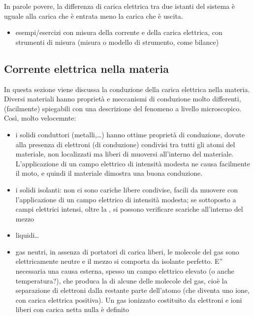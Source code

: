 \documentclass[letterpaper,10pt,italian]{jupyterBook}
\begin{document}
\sphinxAtStartPar
In parole povere, la differenza di carica elettrica tra due istanti del sistema è uguale alla carica che è entrata meno la carica che è uscita.
\begin{itemize}
\item {} 
\sphinxAtStartPar
{} esempi/esercizi con misura della corrente e della carica elettrica, con strumenti di misura (misura o modello di strumento, come bilance)

\end{itemize}


\subsection{Corrente elettrica nella materia}
\label{\detokenize{ch/electromagnetism/electric-current:corrente-elettrica-nella-materia}}
\sphinxAtStartPar
In questa sezione viene discussa la conduzione della carica elettrica nella materia. Diversi materiali hanno proprietà e meccanismi di conduzione molto differenti, (facilmente) spiegabili con una descrizione del fenomeno a livello microscopico. Così, molto velocemnte:
\begin{itemize}
\item {} 
\sphinxAtStartPar
i solidi conduttori (metalli,…) hanno ottime proprietà di conduzione, dovute alla presenza di elettroni (di conduzione) condivisi tra tutti gli atomi del materiale, non localizzati ma liberi di muoversi all’interno del materiale. L’applicazione di un campo elettrico di intensità modesta ne causa facilmente il moto, e quindi il materiale dimostra una buona conduzione.

\item {} 
\sphinxAtStartPar
i solidi isolanti: non ci sono cariche libere condivise, facili da muovere con l’applicazione di un campo elettrico di intensità modesta; se sottoposto a campi elettrici intensi, oltre la , si possono verificare scariche all’interno del mezzo

\item {} 
\sphinxAtStartPar
liquidi…

\item {} 
\sphinxAtStartPar
gas neutri, in assenza di portatori di carica liberi, le molecole del gas sono elettricamente neutre e il mezzo si comporta da isolante perfetto. E” necessaria una causa esterna, spesso un campo elettrico elevato (o anche temperatura?), che produca la  di alcune delle molecole del gas, cioè la separazione di elettroni dalla restante parte dell’atomo (che diventa uno ione, con carica elettrica positiva). Un gas ionizzato costituito da elettroni e ioni liberi con carica netta nulla è definito 

\end{itemize}
\end{document}
